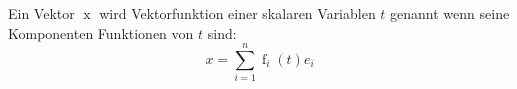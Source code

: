 Ein Vektor $\operatorname{x}$ wird Vektorfunktion einer skalaren Variablen $t$ genannt wenn seine Komponenten Funktionen von $t$ sind:
$$x = \sum\limits_{i=1}^n \operatorname{f}_i(t) e_i$$ 
